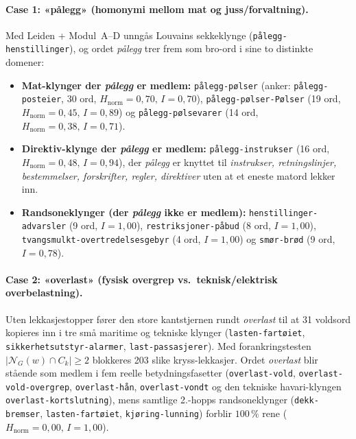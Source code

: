 \documentclass[11pt,a4paper]{article}
\begin{document}
\paragraph{Case 1: «pålegg» (homonymi mellom mat og juss/forvaltning).}
Med Leiden + Modul~A--D unngås Louvains sekkeklynge (\texttt{pålegg-henstillinger}), og ordet \emph{pålegg} trer frem som bro-ord i sine to distinkte domener:
\begin{itemize}
  \item \textbf{Mat-klynger der \emph{pålegg} er medlem:} \texttt{pålegg-pølser} (anker: \texttt{pålegg-posteier}, 30 ord, $H_{\text{norm}}=0{,}70,\, I=0{,}70$), \texttt{pålegg-pølser-Pølser} (19 ord, $H_{\text{norm}}=0{,}45,\, I=0{,}89$) og \texttt{pålegg-pølsevarer} (14 ord, $H_{\text{norm}}=0{,}38,\, I=0{,}71$).
  \item \textbf{Direktiv-klynge der \emph{pålegg} er medlem:} \texttt{pålegg-instrukser} (16 ord, $H_{\text{norm}}=0{,}48,\, I=0{,}94$), der \emph{pålegg} er knyttet til \emph{instrukser, retningslinjer, bestemmelser, forskrifter, regler, direktiver} uten at et eneste matord lekker inn.
  \item \textbf{Randsoneklynger (der \emph{pålegg} ikke er medlem):} \texttt{henstillinger-advarsler} (9 ord, $I=1{,}00$), \texttt{restriksjoner-påbud} (8 ord, $I=1{,}00$), \texttt{tvangsmulkt-overtredelsesgebyr} (4 ord, $I=1{,}00$) og \texttt{smør-brød} (9 ord, $I=0{,}78$).
\end{itemize}

\paragraph{Case 2: «overlast» (fysisk overgrep vs.\ teknisk/elektrisk overbelastning).}
Uten lekkasjestopper fører den store kantstjernen rundt \emph{overlast} til at 31 voldsord kopieres inn i tre små maritime og tekniske klynger (\texttt{lasten-fartøiet}, \texttt{sikkerhetsutstyr-alarmer}, \texttt{last-passasjerer}). Med forankringstesten $|\mathcal{N}_G(w) \cap C_k| \ge 2$ blokkeres 203 slike kryss-lekkasjer. Ordet \emph{overlast} blir stående som medlem i fem reelle betydningsfasetter (\texttt{overlast-vold}, \texttt{overlast-vold-overgrep}, \texttt{overlast-hån}, \texttt{overlast-vondt} og den tekniske havari-klyngen \texttt{overlast-kortslutning}), mens samtlige 2.-hopps randsoneklynger (\texttt{dekk-bremser}, \texttt{lasten-fartøiet}, \texttt{kjøring-lunning}) forblir $100\,\%$ rene ($H_{\text{norm}}=0{,}00,\, I=1{,}00$).

\end{document}
